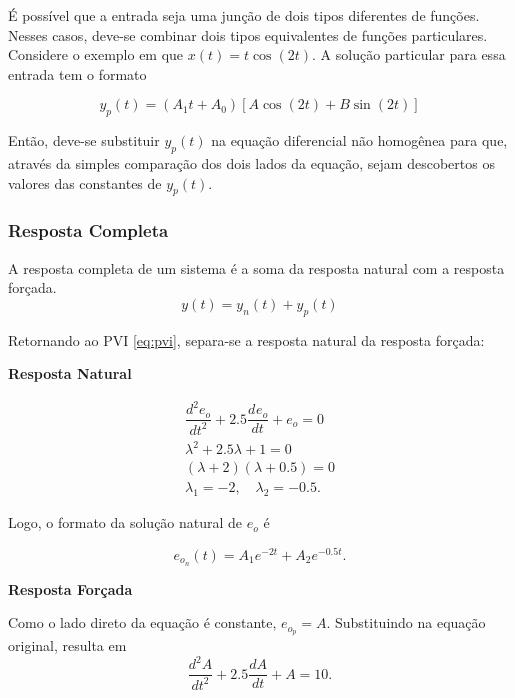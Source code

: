 \documentclass{article}
\numberwithin{equation}{section}
\newcommand{\deo}[1]{\dfrac{d^{#1}e_o}{dt^{#1}}}
\begin{document}
É possível que a entrada seja uma junção de dois tipos diferentes de funções. Nesses casos, deve-se combinar dois tipos equivalentes de funções particulares. Considere o exemplo em que $x(t) = t \cos(2t)$. A solução particular para essa entrada tem o formato

\begin{equation*}
    y_{p}(t)=(A_{1}t+A_{0})[A\cos(2t)+B\sin(2t)]
\end{equation*}

Então, deve-se substituir $y_{p}(t)$ na equação diferencial não homogênea para que, através da simples comparação dos dois lados da equação, sejam descobertos os valores das constantes de $y_{p}(t)$.

\subsubsection{Resposta Completa}
\label{subsubsec:completa}

A resposta completa de um sistema é a soma da resposta natural com a resposta forçada. $$y(t)=y_n(t)+y_p(t)$$

Retornando ao PVI \eqref{eq:pvi}, separa-se a resposta natural da resposta forçada:
\vspace{2mm}
\begin{center}{\textbf{Resposta Natural}}\end{center}
\begin{gather*}
    \deo{2} + 2.5\deo{} + e_o = 0
    \\
    \lambda^{2} + 2.5\lambda + 1 = 0
    \\
    (\lambda+2)(\lambda+0.5) = 0
    \\
    \lambda_{1}=-2, \quad \lambda_{2}=-0.5.
\end{gather*}

\noindent Logo, o formato da solução natural de $e_o$ é

\begin{equation}
    e_{o_n}(t) = A_1e^{-2t}+A_2e^{-0.5t}.
\end{equation}
\vspace{0.1cm}
\begin{center}{\textbf{Resposta Forçada}}\end{center}
Como o lado direto da equação é constante, $e_{o_p} = A$. Substituindo na equação original, resulta em
\begin{equation*}
    \frac{d^2A}{dt^2} + 2.5 \frac{dA}{dt} + A = 10.
\end{equation*}
\end{document}
